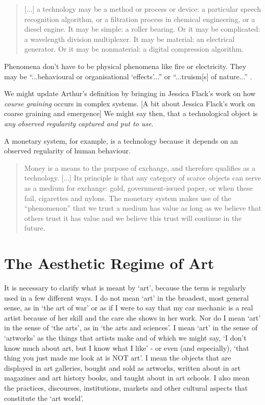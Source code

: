 \documentclass[letterpaper]{article}
\begin{document}
    \begin{quote}
        [...] a technology may be a method or process or device: a particular speech recognition algorithm, or a filtration process in chemical engineering, or a diesel engine. It may be simple: a roller bearing. Or it may be complicated: a wavelength division multiplexer. It may be material: an electrical generator. Or it may be nonmaterial: a digital compression algorithm.
    \end{quote}

    Phenomena don't have to be physical phenomena like fire or electricity. They may be “...behavioural or organisational ‘effects’...” \citep[p.55]{theNatureOfTechnology2009} or “...truism[s] of nature...” \citep[p.45]{theNatureOfTechnology2009}.
   
    We might update Arthur's definition by bringing in Jessica Flack's work on how \emph{course graining} occurs in complex systems. [A bit about Jessica Flack's work on coarse graining and emergence] We might say then, that a technological object is \emph{any observed regularity captured and put to use}.

    A monetary system, for example, is a technology because it depends on an observed regularity of human behaviour.

    \begin{quote}
        Money is a means to the purpose of exchange, and therefore qualifies as a technology. [...] Its principle is that any category of scarce objects can serve as a medium for exchange: gold, government-issued paper, or when these fail, cigarettes and nylons. The monetary system makes use of the “phenomenon” that we trust a medium has value as long as we believe that others trust it has value and we believe this trust will continue in the future. \citep[p.55]{theNatureOfTechnology2009}
    \end{quote}

\section{The Aesthetic Regime of Art}

    It is necessary to clarify what is meant by ‘art’, because the term is regularly used in a few different ways. I do not mean ‘art’ in the broadest, most general sense, as in ‘the art of war’ or as if I were to say that my car mechanic is a real artist because of her skill and the care she shows in her work. Nor do I mean ‘art’ in the sense of ‘the arts’, as in ‘the arts and sciences’. I mean ‘art’ in the sense of ‘artworks’ as the things that artists make and of which we might say, ‘I don't know much about art, but I know what I like’ - or even (and especially), ‘that thing you just made me look at is NOT art’. I mean the objects that are displayed in art galleries, bought and sold as artworks, written about in art magazines and art history books, and taught about in art schools. I also mean the practices, discourses, institutions, markets and other cultural aspects that constitute the ‘art world’.
\end{document}
